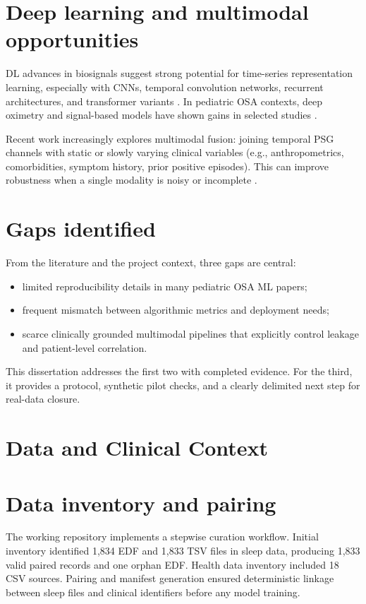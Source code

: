 \documentclass[10pt,a4paper,twocolumn]{article}
\newcommand{\chapter}[1]{\section{#1}}
\begin{document}
\section{Deep learning and multimodal opportunities}
DL advances in biosignals suggest strong potential for time-series representation learning, especially with CNNs, temporal convolution networks, recurrent architectures, and transformer variants \citep{hannun2019cardiology,biswal2018sleeptransformer}. In pediatric OSA contexts, deep oximetry and signal-based models have shown gains in selected studies \citep{vaquerizo2021cnn,mostafa2019sleepedf}.

Recent work increasingly explores multimodal fusion: joining temporal PSG channels with static or slowly varying clinical variables (e.g., anthropometrics, comorbidities, symptom history, prior positive episodes). This can improve robustness when a single modality is noisy or incomplete \citep{baltrusaitis2019multimodal,liang2022multimodal}.

\section{Gaps identified}
From the literature and the project context, three gaps are central:
\begin{itemize}[leftmargin=1.2cm]
    \item limited reproducibility details in many pediatric OSA ML papers;
    \item frequent mismatch between algorithmic metrics and deployment needs;
    \item scarce clinically grounded multimodal pipelines that explicitly control leakage and patient-level correlation.
\end{itemize}

This dissertation addresses the first two with completed evidence. For the third, it provides a protocol, synthetic pilot checks, and a clearly delimited next step for real-data closure.

\chapter{Data and Clinical Context}
\section{Data inventory and pairing}
The working repository implements a stepwise curation workflow. Initial inventory identified 1,834 EDF and 1,833 TSV files in sleep data, producing 1,833 valid paired records and one orphan EDF. Health data inventory included 18 CSV sources. Pairing and manifest generation ensured deterministic linkage between sleep files and clinical identifiers before any model training.
\end{document}
